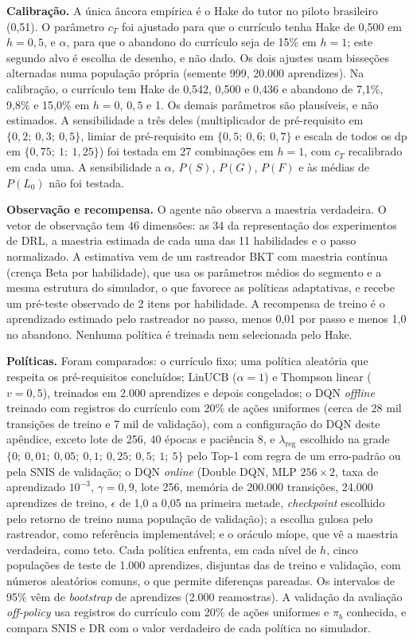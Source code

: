 \noindent\textbf{Calibração.} A única âncora empírica é o Hake do tutor no piloto brasileiro (0,51). O parâmetro $c_T$ foi ajustado para que o currículo tenha Hake de 0,500 em $h = 0{,}5$, e $\alpha$, para que o abandono do currículo seja de 15\% em $h = 1$; este segundo alvo é escolha de desenho, e não dado. Os dois ajustes usam bisseções alternadas numa população própria (semente 999, 20.000 aprendizes). Na calibração, o currículo tem Hake de 0,542, 0,500 e 0,436 e abandono de 7,1\%, 9,8\% e 15,0\% em $h = 0$, $0{,}5$ e 1. Os demais parâmetros são plausíveis, e não estimados. A sensibilidade a três deles (multiplicador de pré-requisito em $\{0{,}2;\ 0{,}3;\ 0{,}5\}$, limiar de pré-requisito em $\{0{,}5;\ 0{,}6;\ 0{,}7\}$ e escala de todos os dp em $\{0{,}75;\ 1;\ 1{,}25\}$) foi testada em 27 combinações em $h = 1$, com $c_T$ recalibrado em cada uma. A sensibilidade a $\alpha$, $P(S)$, $P(G)$, $P(F)$ e às médias de $P(L_0)$ não foi testada.

\noindent\textbf{Observação e recompensa.} O agente não observa a maestria verdadeira. O vetor de observação tem 46 dimensões: as 34 da representação dos experimentos de DRL, a maestria estimada de cada uma das 11 habilidades e o passo normalizado. A estimativa vem de um rastreador BKT com maestria contínua (crença Beta por habilidade), que usa os parâmetros médios do segmento e a mesma estrutura do simulador, o que favorece as políticas adaptativas, e recebe um pré-teste observado de 2 itens por habilidade. A recompensa de treino é o aprendizado estimado pelo rastreador no passo, menos 0,01 por passo e menos 1,0 no abandono. Nenhuma política é treinada nem selecionada pelo Hake.

\noindent\textbf{Políticas.} Foram comparados: o currículo fixo; uma política aleatória que respeita os pré-requisitos concluídos; LinUCB ($\alpha = 1$) e Thompson linear ($v = 0{,}5$), treinados em 2.000 aprendizes e depois congelados; o DQN \textit{offline} treinado com registros do currículo com 20\% de ações uniformes (cerca de 28 mil transições de treino e 7 mil de validação), com a configuração do DQN deste apêndice, exceto lote de 256, 40 épocas e paciência 8, e $\lambda_{\text{reg}}$ escolhido na grade $\{0;\ 0{,}01;\ 0{,}05;\ 0{,}1;\ 0{,}25;\ 0{,}5;\ 1;\ 5\}$ pelo Top-1 com regra de um erro-padrão ou pela SNIS de validação; o DQN \textit{online} (Double DQN, MLP $256 \times 2$, taxa de aprendizado $10^{-3}$, $\gamma = 0{,}9$, lote 256, memória de 200.000 transições, 24.000 aprendizes de treino, $\epsilon$ de 1,0 a 0,05 na primeira metade, \textit{checkpoint} escolhido pelo retorno de treino numa população de validação); a escolha gulosa pelo rastreador, como referência implementável; e o oráculo míope, que vê a maestria verdadeira, como teto. Cada política enfrenta, em cada nível de $h$, cinco populações de teste de 1.000 aprendizes, disjuntas das de treino e validação, com números aleatórios comuns, o que permite diferenças pareadas. Os intervalos de 95\% vêm de \textit{bootstrap} de aprendizes (2.000 reamostras). A validação da avaliação \textit{off-policy} usa registros do currículo com 20\% de ações uniformes e $\pi_b$ conhecida, e compara SNIS e DR com o valor verdadeiro de cada política no simulador.

